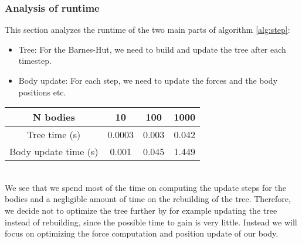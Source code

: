 \documentclass[a4paper]{scrartcl}
\begin{document}
        \subsubsection{Analysis of runtime}\label{sec:Runtime}
            This section analyzes the runtime of the two main parts of algorithm
            \ref{alg:step}:
            \begin{itemize}
                \item Tree: For the Barnes-Hut, we need to build and update the tree after each timestep.
                \item Body update: For each step, we need to update the forces and the body positions etc.
            \end{itemize}
            \noindent\begin{tabular}{c|c|c|c}
                N bodies & 10 & 100 & 1000 \\
                \hline
                Tree time (s) & 0.0003 & 0.003 & 0.042 \\
                Body update time (s) & 0.001 & 0.045 & 1.449\\
            \end{tabular}\\[10pt]
            We see that we spend most of the time on computing the update steps
            for the bodies and a negligible amount of time on the rebuilding of
            the tree. Therefore, we decide not to optimize the tree further by
            for example updating the tree instead of rebuilding, since the
            possible time to gain is very little. Instead we will focus on
            optimizing the force computation and position update of our body.
\end{document}
